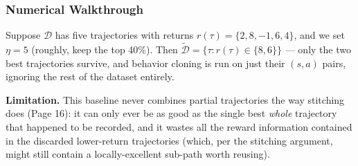 \subsubsection*{Numerical Walkthrough}

Suppose $\mathcal D$ has five trajectories with returns $r(\tau) = \{2, 8, -1, 6, 4\}$, and we set $\eta = 5$ (roughly, keep the top 40\%). Then $\widetilde{\mathcal D} = \{\tau : r(\tau) \in \{8, 6\}\}$ --- only the two best trajectories survive, and behavior cloning is run on just their $(s,a)$ pairs, ignoring the rest of the dataset entirely.

\textbf{Limitation.} This baseline never combines partial trajectories the way stitching does (Page 16): it can only ever be as good as the single best \emph{whole} trajectory that happened to be recorded, and it wastes all the reward information contained in the discarded lower-return trajectories (which, per the stitching argument, might still contain a locally-excellent sub-path worth reusing).
